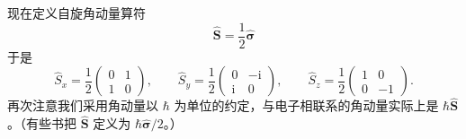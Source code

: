 现在定义自旋角动量算符
\begin{equation*}
\hat{\mathbf{S}} = \frac{1}{2}\hat{\boldsymbol{\sigma}}\tag{1.42}
\end{equation*}
于是
\begin{equation*}
\hat{S}_x = \frac{1}{2}\begin{pmatrix} 0 & 1 \\ 1 & 0 \end{pmatrix},\qquad
\hat{S}_y = \frac{1}{2}\begin{pmatrix} 0 & -\mathrm{i} \\ \mathrm{i} & 0 \end{pmatrix},\qquad
\hat{S}_z = \frac{1}{2}\begin{pmatrix} 1 & 0 \\ 0 & -1 \end{pmatrix}.\tag{1.43}
\end{equation*}
再次注意我们采用角动量以 $\hbar$ 为单位的约定，与电子相联系的角动量实际上是
$\hbar\hat{\mathbf{S}}$。（有些书把 $\hat{\mathbf{S}}$ 定义为 $\hbar\hat{\boldsymbol{\sigma}}/2$。）

